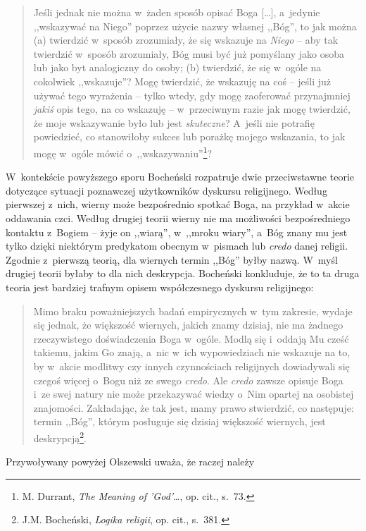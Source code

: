 \begin{quote}
Jeśli jednak nie można w~żaden sposób opisać Boga [\ldots], a~jedynie ,,wskazywać na Niego'' poprzez użycie nazwy własnej ,,Bóg'', to jak można (a) twierdzić w~sposób zrozumiały, że się wskazuje na \textit{Niego} -- aby tak twierdzić w~sposób zrozumiały, Bóg musi być już pomyślany jako osoba lub jako byt analogiczny do osoby; (b) twierdzić, że się w~ogóle na cokolwiek ,,wskazuje''? Mogę twierdzić, że wskazuję na coś -- jeśli już używać tego wyrażenia -- tylko wtedy, gdy mogę zaoferować przynajmniej \textit{jakiś} opis tego, na co wskazuję -- w~przeciwnym razie jak mogę twierdzić, że moje wskazywanie było lub jest \textit{skuteczne}? A~jeśli nie potrafię powiedzieć, co stanowiłoby sukces lub porażkę mojego wskazania, to jak mogę w~ogóle mówić o~,,wskazywaniu''\footnote{M. Durrant, \textit{The Meaning of 'God'}\ldots, op. cit., s.~73.}?
\end{quote}

W~kontekście powyższego sporu Bocheński rozpatruje dwie przeciwstawne teorie dotyczące sytuacji poznawczej użytkowników dyskursu religijnego. Według pierwszej z~nich, wierny może bezpośrednio spotkać Boga, na przykład w~akcie oddawania czci. Według drugiej teorii wierny nie ma możliwości bezpośredniego kontaktu z~Bogiem -- żyje on ,,wiarą'', w~,,mroku wiary'', a~Bóg znany mu jest tylko dzięki niektórym predykatom obecnym w~pismach lub \textit{credo} danej religii. Zgodnie z~pierwszą teorią, dla wiernych termin ,,Bóg'' byłby nazwą. W~myśl drugiej teorii byłaby to dla nich deskrypcja. Bocheński konkluduje, że to ta druga teoria jest bardziej trafnym opisem współczesnego dyskursu religijnego:

\begin{quote}
Mimo braku poważniejszych badań empirycznych w~tym zakresie, wydaje się jednak, że większość wiernych, jakich znamy dzisiaj, nie ma żadnego rzeczywistego doświadczenia Boga w~ogóle. Modlą się i~oddają Mu cześć takiemu, jakim Go znają, a~nic w~ich wypowiedziach nie wskazuje na to, by w~akcie modlitwy czy innych czynnościach religijnych dowiadywali się czegoś więcej o~Bogu niż ze swego \textit{credo}. Ale \textit{credo} zawsze opisuje Boga i~ze swej natury nie może przekazywać wiedzy o~Nim opartej na osobistej znajomości. Zakładając, że tak jest, mamy prawo stwierdzić, co następuje: termin ,,Bóg'', którym posługuje się dzisiaj większość wiernych, jest deskrypcją\footnote{J.M. Bocheński, \textit{Logika religii}, op. cit., s.~381.}.
\end{quote}
Przywoływany powyżej Olszewski uważa, że raczej należy

